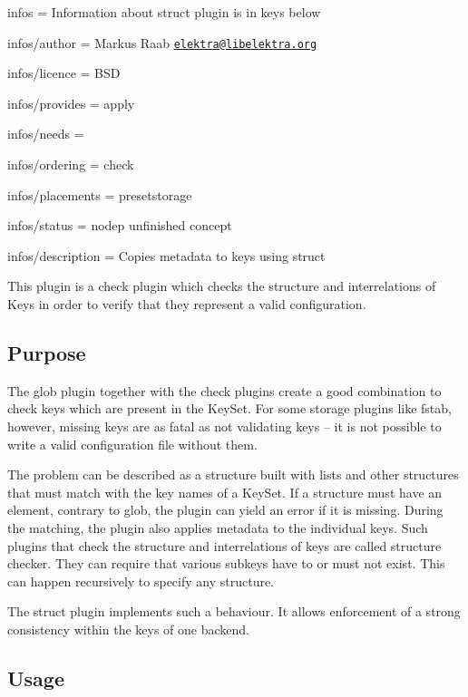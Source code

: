
\begin{DoxyItemize}
\item infos = Information about struct plugin is in keys below
\item infos/author = Markus Raab \href{mailto:elektra@libelektra.org}{\tt elektra@libelektra.\+org}
\item infos/licence = B\+S\+D
\item infos/provides = apply
\item infos/needs =
\item infos/ordering = check
\item infos/placements = presetstorage
\item infos/status = nodep unfinished concept
\item infos/description = Copies metadata to keys using struct
\end{DoxyItemize}

This plugin is a check plugin which checks the structure and interrelations of Keys in order to verify that they represent a valid configuration.

\subsection*{Purpose}

The glob plugin together with the check plugins create a good combination to check keys which are present in the Key\+Set. For some storage plugins like fstab, however, missing keys are as fatal as not validating keys – it is not possible to write a valid configuration file without them.

The problem can be described as a structure built with lists and other structures that must match with the key names of a Key\+Set. If a structure must have an element, contrary to glob, the plugin can yield an error if it is missing. During the matching, the plugin also applies metadata to the individual keys. Such plugins that check the structure and interrelations of keys are called structure checker. They can require that various subkeys have to or must not exist. This can happen recursively to specify any structure.

The struct plugin implements such a behaviour. It allows enforcement of a strong consistency within the keys of one backend.

\subsection*{Usage}


